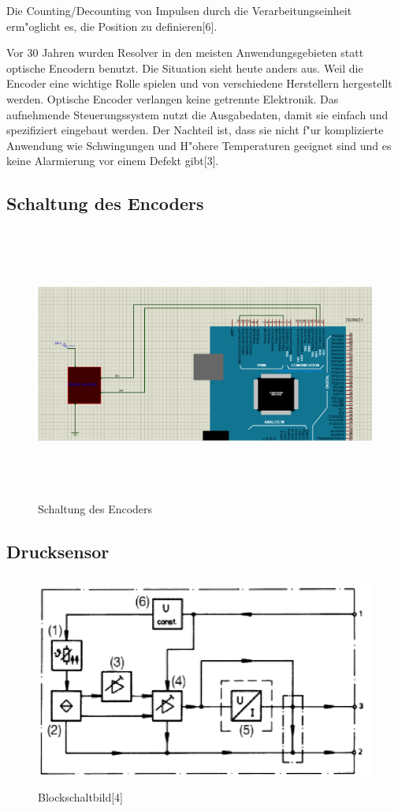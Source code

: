 Die Counting/Decounting von Impulsen durch die Verarbeitungseinheit
erm"oglicht es,  die Position zu definieren[6].


Vor 30 Jahren wurden Resolver in den meisten Anwendungsgebieten 
statt optische Encodern benutzt. Die Situation sieht heute anders aus.
 Weil die Encoder eine wichtige Rolle spielen und 
 von verschiedene Herstellern hergestellt werden. 
 Optische Encoder verlangen keine getrennte Elektronik. 
 Das aufnehmende Steuerungssystem nutzt die Ausgabedaten, 
 damit sie einfach und spezifiziert eingebaut werden. 
 Der Nachteil ist, 
 dass sie nicht f"ur komplizierte Anwendung wie Schwingungen 
 und  H"ohere Temperaturen geeignet sind und
 es  keine Alarmierung vor einem Defekt gibt[3].

\subsection{Schaltung des Encoders}
\begin{figure}[!htb]
\begin{center}
\includegraphics[height=9cm]{bilder/Rot.eps}
\end{center}
\caption{Schaltung des Encoders}
\end{figure}

\subsection{Drucksensor}
\begin{figure}[!htb]
\begin{center}
\includegraphics[height=7cm]{bilder/Blo.eps}
\end{center}
\caption{Blockschaltbild[4]}\label{fig:Blo}
\end{figure}


